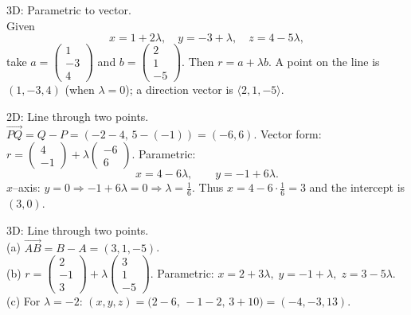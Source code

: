 \documentclass[11pt]{article}
\def\textbf#1{#1}%
\def\mathbf#1{#1}%
\begin{document}
\begin{solution}
\textbf{3D: Parametric to vector.}\\
Given
\[
x=1+2\lambda,\quad y=-3+\lambda,\quad z=4-5\lambda,
\]
take \(\mathbf{a}=\begin{pmatrix}1\\-3\\4\end{pmatrix}\) and \(\mathbf{b}=\begin{pmatrix}2\\1\\-5\end{pmatrix}\).  
Then \(\mathbf{r}=\mathbf{a}+\lambda\mathbf{b}\).  
A point on the line is \((1,-3,4)\) (when \(\lambda=0\)); a direction vector is \(\langle2,1,-5\rangle\).
\end{solution}

\begin{solution}
\textbf{2D: Line through two points.}\\
\(\overrightarrow{PQ}=Q-P=(-2-4,\,5-(-1))=(-6,6)\).  
Vector form: \(\displaystyle \mathbf{r}=\begin{pmatrix}4\\-1\end{pmatrix}+\lambda\begin{pmatrix}-6\\6\end{pmatrix}\).  
Parametric:
\[
x=4-6\lambda,\qquad y=-1+6\lambda.
\]
$x$–axis: \(y=0\Rightarrow -1+6\lambda=0\Rightarrow \lambda=\tfrac{1}{6}\).  
Thus \(x=4-6\cdot\tfrac{1}{6}=3\) and the intercept is \((3,0)\).
\end{solution}

\begin{solution}
\textbf{3D: Line through two points.}\\
(a) \(\overrightarrow{AB}=B-A=(3,1,-5)\).\\
(b) \(\displaystyle \mathbf{r}=\begin{pmatrix}2\\-1\\3\end{pmatrix}+\lambda\begin{pmatrix}3\\1\\-5\end{pmatrix}\).  
Parametric: \(x=2+3\lambda,\; y=-1+\lambda,\; z=3-5\lambda\).\\
(c) For \(\lambda=-2\): \((x,y,z)=\bigl(2-6,\,-1-2,\,3+10\bigr)=(-4,-3,13)\).
\end{solution}
\end{document}
